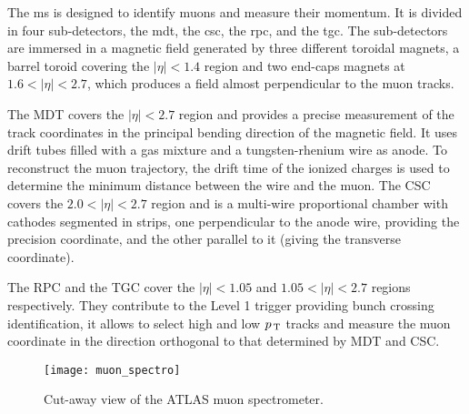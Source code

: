 The \gls{ms} is designed to identify muons and measure their momentum. It is
divided in four sub-detectors, the \gls{mdt}, the \gls{csc}, the \gls{rpc}, and
the \gls{tgc}. The sub-detectors are immersed in a magnetic field generated by
three different toroidal magnets, a barrel toroid covering the $|\eta| < 1.4$
region and two end-caps magnets at $1.6 < |\eta| < 2.7$, which produces a field
almost perpendicular to the muon tracks.

The MDT covers the $|\eta| < 2.7$ region and provides a precise measurement of
the track coordinates in the principal bending direction of the magnetic
field. It uses drift tubes filled with a gas mixture and a tungsten-rhenium wire
as anode. To reconstruct the muon trajectory, the drift time of the ionized
charges is used to determine the minimum distance between the wire and the
muon. The CSC covers the $2.0 < |\eta| < 2.7$ region and is a multi-wire
proportional chamber with cathodes segmented in strips, one perpendicular to the
anode wire, providing the precision coordinate, and the other parallel to it
(giving the transverse coordinate).


The RPC and the TGC cover the $|\eta| < 1.05$ and $1.05 < |\eta| < 2.7$ regions
respectively. They contribute to the Level 1 trigger providing bunch crossing
identification, it allows to select high and low $p_\mathrm{\, T}$ tracks and measure the
muon coordinate in the direction orthogonal to that determined by MDT and CSC\@.

\begin{figure}[!h]
  \centering
    \texttt{[image: muon\_spectro]}
    \caption{Cut-away view of the ATLAS muon spectrometer.}
    \label{fig:muon_spectro}
\end{figure}
